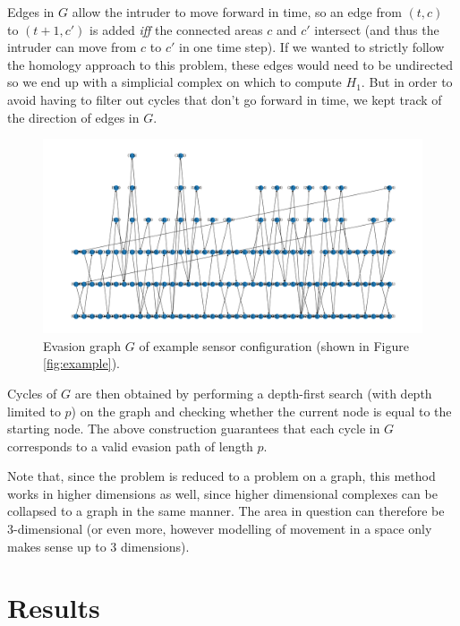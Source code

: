 \documentclass{article}
\begin{document}
Edges in $G$ allow the intruder to move forward in time, so an edge from $(t, c)$ to $(t + 1, c')$ is added {\it iff} the connected areas $c$ and $c'$ intersect (and thus the intruder can move from $c$ to $c'$ in one time step).
If we wanted to strictly follow the homology approach to this problem, these edges would need to be undirected so we end up with a simplicial complex on which to compute $H_1$.
But in order to avoid having to filter out cycles that don't go forward in time, we kept track of the direction of edges in $G$.

\begin{figure}[H]
  \centering
  \includegraphics[width=\linewidth]{example_graph.png}
  \caption{Evasion graph $G$ of example sensor configuration (shown in Figure \ref{fig:example}).}
  \label{fig:example_graph}
\end{figure}

Cycles of $G$ are then obtained by performing a depth-first search (with depth limited to $p$) on the graph and checking whether the current node is equal to the starting node.
The above construction guarantees that each cycle in $G$ corresponds to a valid evasion path of length $p$.

Note that, since the problem is reduced to a problem on a graph, this method works in higher dimensions as well, since higher dimensional complexes can be collapsed to a graph in the same manner.
The area in question can therefore be 3-dimensional (or even more, however modelling of movement in a space only makes sense up to 3 dimensions).

\section{Results}
\end{document}
